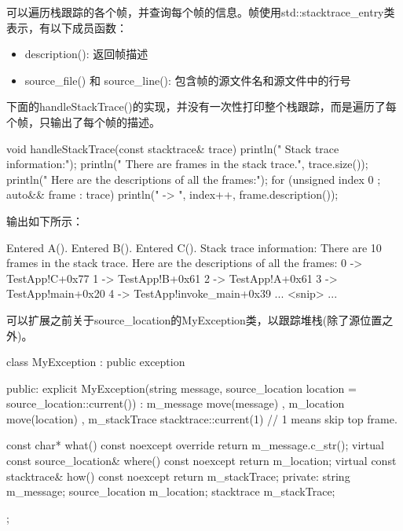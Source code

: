 可以遍历栈跟踪的各个帧，并查询每个帧的信息。帧使用std::stacktrace\_entry类表示，有以下成员函数：

\begin{itemize}
\item
description(): 返回帧描述

\item
source\_file() 和  source\_line(): 包含帧的源文件名和源文件中的行号
\end{itemize}

下面的handleStackTrace()的实现，并没有一次性打印整个栈跟踪，而是遍历了每个帧，只输出了每个帧的描述。

\begin{cpp}
void handleStackTrace(const stacktrace& trace)
{
    println(" Stack trace information:");
    println(" There are {} frames in the stack trace.", trace.size());
    println(" Here are the descriptions of all the frames:");
    for (unsigned index { 0 }; auto&& frame : trace) {
        println(" {} -> {}", index++, frame.description());
    }
}
\end{cpp}

输出如下所示：

\begin{shell}
Entered A().
Entered B().
Entered C().
  Stack trace information:
    There are 10 frames in the stack trace.
    Here are the descriptions of all the frames:
      0 -> TestApp!C+0x77
      1 -> TestApp!B+0x61
      2 -> TestApp!A+0x61
      3 -> TestApp!main+0x20
      4 -> TestApp!invoke_main+0x39
      ... <snip> ...
\end{shell}


可以扩展之前关于source\_location的MyException类，以跟踪堆栈(除了源位置之外)。

\begin{cpp}
class MyException : public exception
{
    public:
        explicit MyException(string message,
        source_location location = source_location::current())
            : m_message { move(message) }
            , m_location { move(location) }
            , m_stackTrace { stacktrace::current(1) } // 1 means skip top frame.
        { }

        const char* what() const noexcept override { return m_message.c_str(); }
        virtual const source_location& where() const noexcept{ return m_location; }
        virtual const stacktrace& how() const noexcept { return m_stackTrace; }
    private:
        string m_message;
        source_location m_location;
        stacktrace m_stackTrace;
};
\end{cpp}

